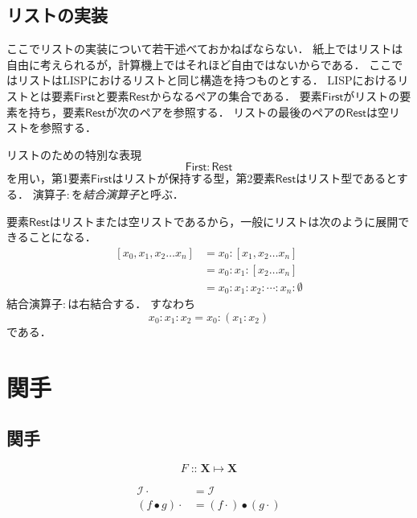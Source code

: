 \documentclass[twocolumn]{jsbook}
\newcommand{\keyword}[1]{\emph{#1}}
\newcommand{\constantempty}{\emptyset}
\newcommand{\binarycompose}{\bullet}
\newcommand{\binaryfunctormap}{\cdot}
\newcommand{\binaryconcat}{:}
\newcommand{\listtype}[1]{\left[#1\right]}
\newcommand{\rangedots}{\dots}
\newcommand{\istypeof}{\mathop{::}}
\newcommand{\specialwordname}[1]{\mathsf{#1}}
\newcommand{\specialwordfirst}{\specialwordname{First}}
\newcommand{\specialwordrest}{\specialwordname{Rest}}
\newcommand{\mathidentitymorph}{\mathcal{I}}
\newcommand{\mathsetname}[1]{\boldsymbol{#1}}
\begin{document}
\section{リストの実装}

ここでリストの実装について若干述べておかねばならない．
紙上ではリストは自由に考えられるが，計算機上ではそれほど自由ではないからである．
ここではリストはLISPにおけるリストと同じ構造を持つものとする．
LISPにおけるリストとは要素$\specialwordfirst$と要素$\specialwordrest$からなるペアの集合である．
要素$\specialwordfirst$がリストの要素を持ち，要素$\specialwordrest$が次のペアを参照する．
リストの最後のペアの$\specialwordrest$は空リストを参照する．

リストのための特別な表現$$\specialwordfirst\binaryconcat\specialwordrest$$を用い，第1要素$\specialwordfirst$はリストが保持する型，第2要素$\specialwordrest$はリスト型であるとする．
演算子$\binaryconcat$を\keyword{結合演算子}と呼ぶ．

要素$\specialwordrest$はリストまたは空リストであるから，一般にリストは次のように展開できることになる．
\begin{align*}
\listtype{x_0,x_1,x_2\rangedots x_n}&=x_0\binaryconcat\listtype{x_1,x_2\rangedots x_n}\\
&=x_0\binaryconcat x_1\binaryconcat\listtype{x_2\rangedots x_n}\\
&=x_0\binaryconcat x_1\binaryconcat x_2\binaryconcat\dotsb\binaryconcat x_n\binaryconcat\constantempty
\end{align*}
結合演算子$\binaryconcat$は右結合する．
すなわち$$x_0\binaryconcat x_1\binaryconcat x_2=x_0\binaryconcat(x_1\binaryconcat x_2)$$である．


\chapter{関手}

\section{関手}

$$F\istypeof\mathsetname{X}\mapsto\mathsetname{X}$$

\begin{align}
\mathidentitymorph\binaryfunctormap&=\mathidentitymorph\\
(f\binarycompose g)\binaryfunctormap&=(f\binaryfunctormap)\binarycompose(g\binaryfunctormap)
\end{align}
\end{document}
